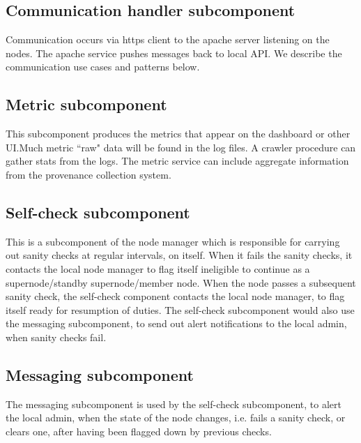 \documentclass[oneside,12pt]{memoir}
\begin{document}
\subsection{Communication handler subcomponent}
Communication occurs via https client to the apache server listening on the nodes.   The apache service pushes messages back to local API.    We describe the communication use cases and patterns below.


\subsection{Metric subcomponent}

This subcomponent produces the metrics that appear on the dashboard or other UI.Much metric ``raw" data will be found in the log files.  A crawler procedure can gather stats from the logs.   The metric service can include aggregate information from the provenance collection system. 

\subsection{Self-check subcomponent}
This is a subcomponent of the node manager which is responsible for carrying out sanity checks at regular intervals, on itself. When it fails the sanity checks, it contacts the local node manager to flag itself ineligible to continue as a supernode/standby supernode/member node. When the node passes a subsequent sanity check, the self-check component contacts the local node manager, to flag itself ready for resumption of duties.  The self-check subcomponent would also use the messaging subcomponent, to send out alert notifications to the local admin, when sanity checks fail.

\subsection{Messaging subcomponent}
The messaging subcomponent is used by the self-check subcomponent, to alert the local admin, when the state of the node changes, i.e. fails a sanity check, or clears one, after having been flagged down by previous checks.
\end{document}
